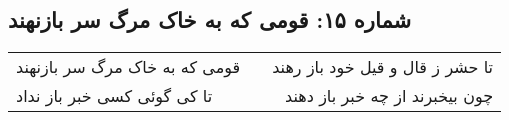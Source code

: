 \begin{center}
\section*{شماره ۱۵: قومی که به خاک مرگ سر بازنهند}
\label{sec:015}
\begin{longtable}{l p{0.5cm} r}
قومی که به خاک مرگ سر بازنهند
&&
تا حشر ز قال و قیل خود باز رهند
\\
تا کی گوئی کسی خبر باز نداد
&&
چون بیخبرند از چه خبر باز دهند
\\
\end{longtable}
\end{center}
